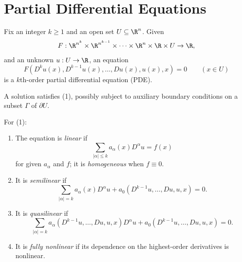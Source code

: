 
\section{Partial Differential Equations}
\label{sec:pde-introduction}

\begin{definition}
\label{def:kth-order-pde}
\leanok
Fix an integer $k \geq 1$ and an open set $U \subseteq \R^n$. Given
$$F : \R^{n^k} \times \R^{n^{k-1}} \times \cdots \times \R^n \times \R \times U \to \R,$$
and an unknown $u : U \to \R$, an equation
\begin{equation}
F(D^k u(x), D^{k-1} u(x), \ldots, Du(x), u(x), x) = 0 \qquad (x \in U)
\tag{1}
\end{equation}
is a $k$th-order partial differential equation (PDE).
\end{definition}

A solution satisfies (1), possibly subject to auxiliary boundary conditions on
a subset $\Gamma$ of $\partial U$.

\begin{definition}
\label{def:linear-semilinear-quasilinear-fully-nonlinear}
\leanok
For (1):

\begin{enumerate}
\item The equation is \emph{linear} if
$$\sum_{|\alpha| \leq k} a_\alpha(x) D^\alpha u = f(x)$$
for given $a_\alpha$ and $f$; it is \emph{homogeneous} when $f \equiv 0$.

\item It is \emph{semilinear} if
$$\sum_{|\alpha|=k} a_\alpha(x) D^\alpha u + a_0(D^{k-1}u, \ldots, Du, u, x) = 0.$$

\item It is \emph{quasilinear} if
$$\sum_{|\alpha|=k} a_\alpha(D^{k-1}u, \ldots, Du, u, x) D^\alpha u + a_0(D^{k-1}u, \ldots, Du, u, x) = 0.$$

\item It is \emph{fully nonlinear} if its dependence on the highest-order derivatives is nonlinear.
\end{enumerate}
\end{definition}

